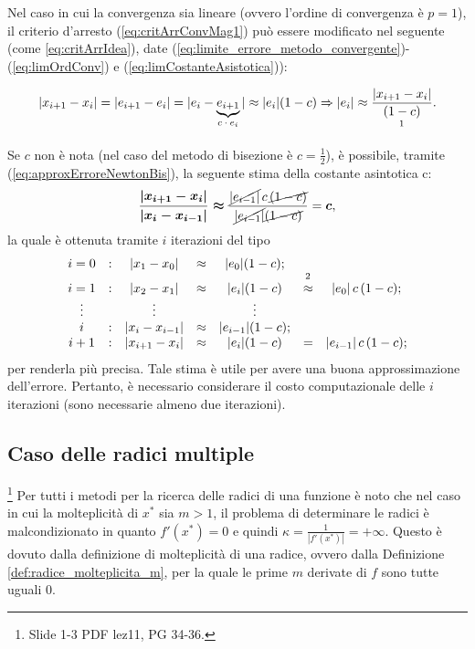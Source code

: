 Nel caso in cui la convergenza sia lineare (ovvero l'ordine di convergenza è $p=1$), il criterio d'arresto (\ref{eq:critArrConvMag1}) può essere modificato nel seguente (come \ref{eq:critArrIdea}), date (\ref{eq:limite_errore_metodo_convergente})-(\ref{eq:limOrdConv}) e (\ref{eq:limCostanteAsistotica})):

\begin{equation}\label{eq:approxErroreNewtonBis}
	|x_{i+1}-x_i|=|e_{i+1}-e_i|=|e_i-\underbrace{e_{i+1}}_\text{$c\cdot e_i$}|\approx |e_i|(1-c)\Rightarrow |e_i|\approx\frac{|x_{i+1}-x_i|}{\underset{\footnotemark}{(1-c)}}.
\end{equation}

Se $c$ non è nota (nel caso del metodo di bisezione è $c=\frac{1}{2}$), è possibile, tramite (\ref{eq:approxErroreNewtonBis}), la seguente stima della costante asintotica c:
\begin{equation*}
	\boldsymbol{\frac{|x_{i+1}-x_i|}{|x_i-x_{i-1}|}\approx}\frac{\cancel{|e_{i-1}|}\,c\,\cancel{(1-c)}}{\cancel{|e_{i-1}|}\cancel{(1-c)}}=\boldsymbol c,
\end{equation*}
la quale è ottenuta tramite $i$ iterazioni del tipo
\begin{equation*}
	\begin{matrix}
		i=0 &:& |x_1-x_0|&\approx& |e_0|(1-c);\\
		i=1 &:& |x_2-x_1|&\approx&|e_i|(1-c)&\overset{\footnotemark}{\approx}&|e_0|\, c\, (1-c);\\
		\vdots & & \vdots & & \vdots \\
		i &:&|x_i-x_{i-1}|&\approx& |e_{i-1}|(1-c);\\
		i+1 &:&|x_{i+1}-x_i|&\approx& |e_i|(1-c) &=& |e_{i-1}|\, c\, (1-c);
	\end{matrix}
\end{equation*}
per renderla più precisa. Tale stima è utile per avere una buona  approssimazione dell'errore. Pertanto, è necessario considerare il costo computazionale delle $i$ iterazioni (sono necessarie almeno due iterazioni).

\subsection{Caso delle radici multiple}
\footnote{Slide 1-3 PDF lez11, PG 34-36.}
Per tutti i metodi per la ricerca delle radici di una funzione è noto che nel caso in cui la molteplicità di $x^*$ sia $m>1$, il problema di determinare le radici è malcondizionato in quanto $f'(x^*) = 0$ e quindi $\kappa = \frac{1}{|f'(x^*)|}=+\infty$. Questo è dovuto dalla definizione di molteplicità di una radice, ovvero dalla Definizione \ref{def:radice_molteplicita_m}, per la quale le prime $m$ derivate di $f$ sono tutte uguali 0.

